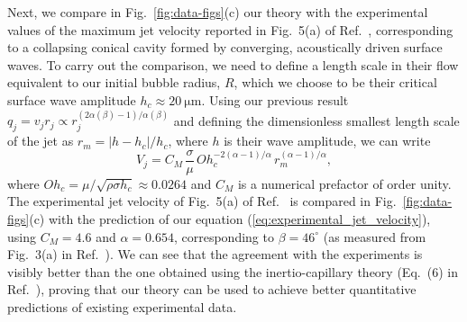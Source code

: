 \documentclass[aps,prl,reprint,floatfix]{revtex4-2}
\begin{document}
Next, we compare in Fig.~\ref{fig:data-figs}(c) our theory with the experimental values of the maximum jet velocity reported in Fig.~5(a) of Ref.~\cite{PRLCattaneo}, corresponding to a collapsing conical cavity formed by converging, acoustically driven surface waves.
To carry out the comparison, we need to define a length scale in their flow equivalent to our initial bubble radius, $R$, which we choose to be their critical surface wave amplitude $h_c \approx \SI{20}{\micro\meter}$. Using our previous result  $q_j=v_j r_j\propto r_j^{(2\alpha(\beta)-1)/\alpha(\beta)}$ and defining the dimensionless smallest length scale of the jet as $r_m = |h - h_c|/h_c$, where $h$ is their wave amplitude, we can write
\begin{equation}
    V_j = C_M \, \frac{\sigma}{\mu} \, Oh_c^{-2(\alpha-1)/\alpha} \, r_m^{(\alpha-1)/\alpha},
    \label{eq:experimental_jet_velocity}
\end{equation}
where $Oh_c = \mu/\sqrt{\rho \sigma h_c} \approx 0.0264$ and $C_M$ is a numerical prefactor of order unity.
The experimental jet velocity of Fig.~5(a) of Ref.~\cite{PRLCattaneo} is compared in Fig.~\ref{fig:data-figs}(c) with the prediction of our equation (\ref{eq:experimental_jet_velocity}), using $C_M = 4.6$ and $\alpha = 0.654$, corresponding to $\beta = 46^\circ$ (as measured from Fig.~3(a) in Ref.~\cite{PRLCattaneo}). We can see that the agreement with the experiments is visibly better than the one obtained using the inertio-capillary theory (Eq.~(6) in Ref.~\cite{PRLCattaneo}), proving that our theory can be used to achieve better quantitative predictions of existing experimental data.
\end{document}
